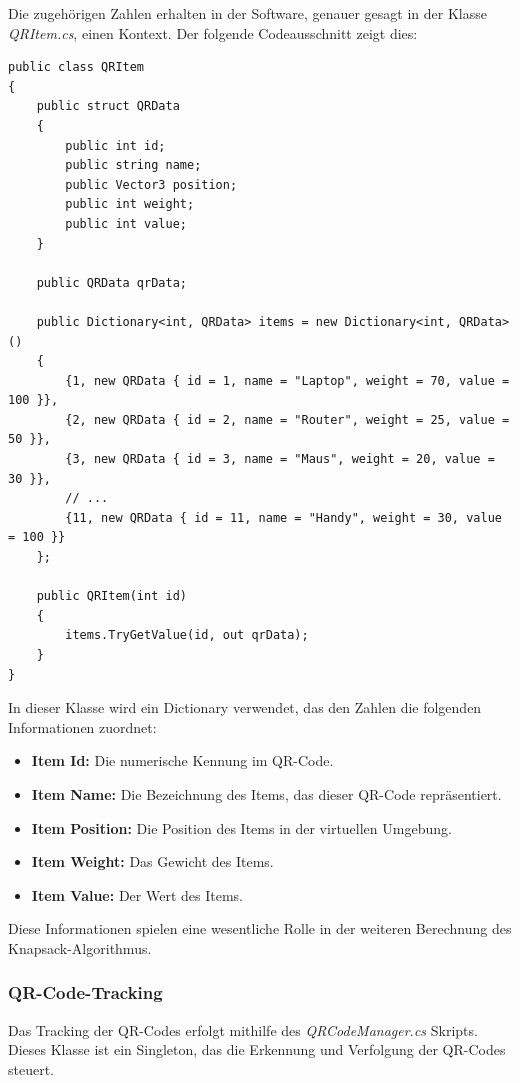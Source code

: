 Die zugehörigen Zahlen erhalten in der Software, genauer gesagt in der Klasse \textit{QRItem.cs}, einen Kontext. Der folgende Codeausschnitt zeigt dies:

\begin{lstlisting}[style=csharp, caption={}, label=code:update]
public class QRItem
{
    public struct QRData
    {
        public int id;
        public string name;
        public Vector3 position;
        public int weight;
        public int value;
    }

    public QRData qrData;

    public Dictionary<int, QRData> items = new Dictionary<int, QRData>()
    {
        {1, new QRData { id = 1, name = "Laptop", weight = 70, value = 100 }},
        {2, new QRData { id = 2, name = "Router", weight = 25, value = 50 }},
        {3, new QRData { id = 3, name = "Maus", weight = 20, value = 30 }},
        // ...
        {11, new QRData { id = 11, name = "Handy", weight = 30, value = 100 }}
    };

    public QRItem(int id)
    {
        items.TryGetValue(id, out qrData);
    }
}
\end{lstlisting}

In dieser Klasse wird ein Dictionary verwendet, das den Zahlen die folgenden Informationen zuordnet:

\begin{itemize}
    \item \textbf{Item Id:} Die numerische Kennung im QR-Code.
    \item \textbf{Item Name:} Die Bezeichnung des Items, das dieser QR-Code repräsentiert.
    \item \textbf{Item Position:} Die Position des Items in der virtuellen Umgebung.
    \item \textbf{Item Weight:} Das Gewicht des Items.
    \item \textbf{Item Value:} Der Wert des Items.
\end{itemize}

Diese Informationen spielen eine wesentliche Rolle in der weiteren Berechnung des Knapsack-Algorithmus.

\subsubsection{QR-Code-Tracking}
Das Tracking der QR-Codes erfolgt mithilfe des \textit{QRCodeManager.cs} Skripts. Dieses Klasse ist ein Singleton, das
die Erkennung und Verfolgung der QR-Codes steuert.

